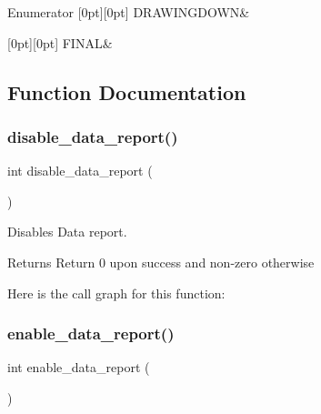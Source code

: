 \begin{DoxyEnumFields}{Enumerator}
[0pt][0pt]{}\mbox{\label{group__mouse_ggadc6e5733fc3c22f0a7b2914188c49c90acc3b3364ddd3d1ff8d1ec4b3a4ccb084}} 
D\+R\+A\+W\+I\+N\+G\+D\+O\+WN&\\
\hline

[0pt][0pt]{}\mbox{\label{group__mouse_ggadc6e5733fc3c22f0a7b2914188c49c90afb43b8264ea4d3dd9957ba1b3fd3f3d5}} 
F\+I\+N\+AL&\\
\hline

\end{DoxyEnumFields}


\subsection{Function Documentation}
\mbox{\label{group__mouse_ga9d37a10902df825a7445faa3261f1a91}} 
\subsubsection{\texorpdfstring{disable\_data\_report()}{disable\_data\_report()}}
{\footnotesize\ttfamily int disable\+\_\+data\+\_\+report (\begin{DoxyParamCaption}{ }\end{DoxyParamCaption})}



Disables Data report. 

\begin{DoxyReturn}{Returns}
Return 0 upon success and non-\/zero otherwise 
\end{DoxyReturn}
Here is the call graph for this function\+:
\mbox{\label{group__mouse_ga898e9289d77e1290373396a43ee9c53d}} 
\subsubsection{\texorpdfstring{enable\_data\_report()}{enable\_data\_report()}}
{\footnotesize\ttfamily int enable\+\_\+data\+\_\+report (\begin{DoxyParamCaption}{ }\end{DoxyParamCaption})}



